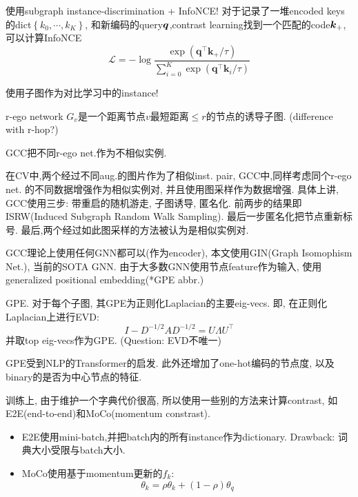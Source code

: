 \documentclass{article}
\begin{document}
\begin{flushleft}

 使用subgraph instance-discrimination + InfoNCE! 对于记录了一堆encoded keys的dict$\left\{k_{0}, \cdots, k_{K}\right\}$, 和新编码的query$\boldsymbol{q}$,contrast learning找到一个匹配的code$\boldsymbol{k}_+$,可以计算InfoNCE
\begin{equation}
    \mathcal{L}=-\log \frac{\exp \left(\boldsymbol{q}^{\top} \boldsymbol{k}_{+} / \tau\right)}{\sum_{i=0}^{K} \exp \left(\boldsymbol{q}^{\top} \boldsymbol{k}_{i} / \tau\right)}
\end{equation}

使用子图作为对比学习中的instance!
\begin{definition}
    r-ego network $G_v$是一个距离节点$v$最短距离$\le r$的节点的诱导子图. (difference with r-hop?)
\end{definition}
GCC把不同r-ego net.作为不相似实例.

在CV中,两个经过不同aug.的图片作为了相似inst. pair, GCC中,同样考虑同个r-ego net. 的不同数据增强作为相似实例对, 并且使用图采样作为数据增强. 具体上讲, GCC使用三步: 带重启的随机游走, 子图诱导, 匿名化. 前两步的结果即ISRW(Induced Subgraph Random Walk Sampling). 最后一步匿名化把节点重新标号. 最后,两个经过如此图采样的方法被认为是相似实例对.

GCC理论上使用任何GNN都可以(作为encoder), 本文使用GIN(Graph Isomophism Net.), 当前的SOTA GNN. 由于大多数GNN使用节点feature作为输入, 使用generalized positional embedding(*GPE abbr.)

\begin{definition}
    GPE. 对于每个子图, 其GPE为正则化Laplacian的主要eig-vecs. 即, 在正则化Laplacian上进行EVD:
    \begin{equation}
        I-D^{-1 / 2} A D^{-1 / 2}=U \Lambda U^{\top}
    \end{equation}
    并取top eig-vecs作为GPE.
    (Question: EVD不唯一)
\end{definition}

GPE受到NLP的Transformer的启发. 此外还增加了one-hot编码的节点度, 以及binary的是否为中心节点的特征.

训练上, 由于维护一个字典代价很高, 所以使用一些别的方法来计算contrast, 如E2E(end-to-end)和MoCo(momentum constrast). \begin{itemize}
    \item E2E使用mini-batch,并把batch内的所有instance作为dictionary. Drawback: 词典大小受限与batch大小.
    \item MoCo使用基于momentum更新的$f_k$: 
    $$
    \theta_k = \rho \theta_k + (1-\rho)\theta_q
    $$
\end{itemize}

\end{flushleft}
\end{document}
